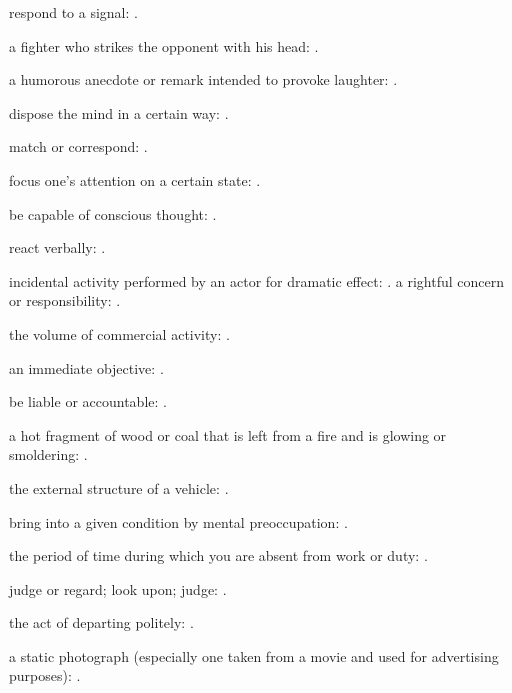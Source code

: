  respond to a signal: .

  a fighter who strikes the opponent with his head: .

  a humorous anecdote or remark intended to provoke laughter:   .

  dispose the mind in a certain way: .

  match or correspond: .

  focus one's attention on a certain state: .

  be capable of conscious thought: .

  react verbally:   .

  incidental activity performed by an actor for dramatic effect:   . a rightful concern or responsibility: .

  the volume of commercial activity: .

  an immediate objective: .

  be liable or accountable: .

  a hot fragment of wood or coal that is left from a fire and is glowing or smoldering:   .

  the external structure of a vehicle: .

  bring into a given condition by mental preoccupation: .

  the period of time during which you are absent from work or duty:   .

  judge or regard; look upon; judge:   .

  the act of departing politely:   .

  a static photograph (especially one taken from a movie and used for advertising purposes): .

